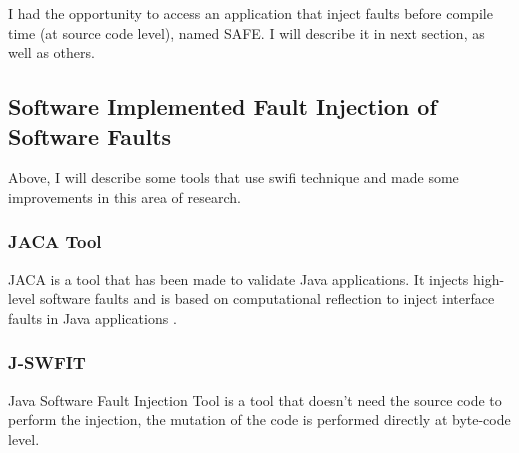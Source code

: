 




I had the opportunity to access an application that inject faults before compile time (at source code level), named SAFE. I will describe it in next section, as well as others.

\clearpage
\subsection{Software Implemented Fault Injection of Software Faults}

Above, I will describe some tools that use \ac{swifi} technique and made some improvements in this area of research.

\subsubsection{JACA Tool}

JACA\cite{regina2003jaca} is a tool that has been made to validate Java applications. It injects high-level software faults and is based on computational reflection to inject interface faults in Java applications
\cite{martins2002jaca}. \\

\subsubsection{J-SWFIT}

Java Software Fault Injection Tool\cite{sanches2011j} is a tool that doesn't need the source code to perform the injection, the mutation of the code is performed directly at byte-code level.\\

